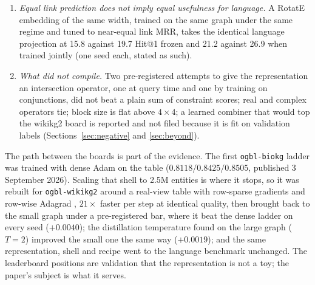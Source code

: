 \documentclass[11pt,a4paper]{article}
\begin{document}
\begin{enumerate}
of a learned parser head, an exact adjacency walk, a fine-tuned text
ranker and a logistic reranker (two pretrained 110M encoders with
learned heads around the 37M table, 404M parameters in all), with no
generative model at query time, reaches 43.1 Hit@1 on the synthesized
test split (second to a 120B-LLM pipeline's 46.2; first on Hit@5,
Recall@20 and MRR) and 28.6 on 98 human-written questions, where those
pipelines reach 58.8 (Section~\ref{sec:beyond}).
\item \emph{Equal link prediction does not imply equal usefulness for
language.} A RotatE embedding of the same width, trained on the same graph
under the same regime and tuned to near-equal link MRR, takes the
identical language projection at 15.8 against 19.7 Hit@1 frozen and 21.2
against 26.9 when trained jointly (one seed each, stated as such).
\item \emph{What did not compile.} Two pre-registered attempts to give
the representation an intersection operator, one at query time and one by
training on conjunctions, did not beat a plain sum of constraint scores;
real and complex operators tie; block size is flat above $4\times4$; a
learned combiner that would top the wikikg2 board is reported and not
filed because it is fit on validation labels
(Sections~\ref{sec:negative} and \ref{sec:beyond}).
\end{enumerate}

The path between the boards is part of the evidence. The first
\texttt{ogbl-biokg} ladder was trained with dense Adam on the table
($0.8118/0.8425/0.8505$, published 3 September 2026). Scaling that shell
to 2.5M entities is where it stops, so it was rebuilt for
\texttt{ogbl-wikikg2} around a real-view table with row-sparse gradients
and row-wise Adagrad \citep{duchi2011adagrad,lerer2019pbg}, $21\times$
faster per step at identical quality, then brought back to the small
graph under a pre-registered bar, where it beat the dense ladder on every
seed ($+0.0040$); the distillation temperature found on the large graph
($T=2$) improved the small one the same way ($+0.0019$); and the same
representation, shell and recipe went to the language benchmark unchanged. The
leaderboard positions are validation that the representation is not a
toy; the paper's subject is what it serves.
\end{document}
